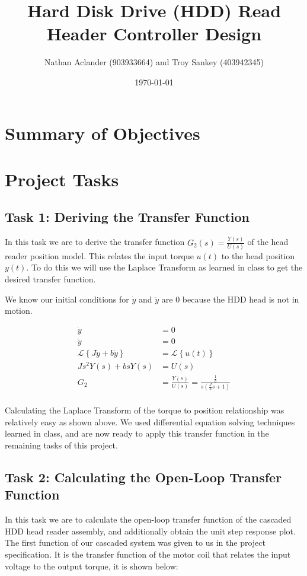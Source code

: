 \documentclass{article}
\title{Hard Disk Drive (HDD) Read Header Controller Design}
\date{\today}
\author{Nathan Aclander (903933664) and Troy Sankey (403942345)}
\begin{document}
\maketitle
\newpage

\section*{Summary of Objectives}

\section*{Project Tasks}
\subsection*{Task 1: Deriving the Transfer Function}

In this task we are to derive the transfer function $G_2(s) =
\frac{Y(s)}{U(s)}$ of the head reader position model. This relates the
input torque $u(t)$ to the head position $y(t)$. To do this we will
use the Laplace Transform as learned in class to get the desired
transfer function.

We know our initial conditions for $\dot{y}$ and $\ddot{y}$ are $0$
because the HDD head is not in motion.

\begin{align*}
  \dot{y} &= 0 \\
  \ddot{y} &= 0 \\
  \mathcal{L}\left\{ J\ddot{y} + b \dot{y}\right\} &= \mathcal{L}\left\{u(t)\right\} \\
  Js^2 Y(s) + bsY(s) &= U(s) \\
  G_2 &= \frac{Y(s)}{U(s)} = \frac{\frac{1}{b}}{s(\frac{J}{b}s + 1)} \\
\end{align*}

Calculating the Laplace Transform of the torque to position
relationship was relatively easy as shown above. We used differential
equation solving techniques learned in class, and are now ready to
apply this transfer function in the remaining tasks of this project.

\subsection*{Task 2: Calculating the Open-Loop Transfer Function}

In this task we are to calculate the open-loop transfer function of
the cascaded HDD head reader assembly, and additionally obtain the
unit step response plot. The first function of our cascaded system was
given to us in the project specification. It is the transfer function
of the motor coil that relates the input voltage to the output torque,
it is shown below:
\end{document}
